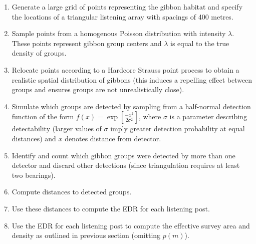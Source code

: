 \documentclass[10pt,a4paper,final]{article}
\begin{document}
\begin{tcolorbox}[breakable, colback=blue!5!white,colframe=blue!75!black]
\begin{enumerate}
\item Generate a large grid of points representing the gibbon habitat and specify the locations of a triangular listening array with spacings of 400 metres.

\item Sample points from a homogenous Poisson distribution with intensity $\lambda$. These points represent gibbon group centers and $\lambda$ is equal to the true density of groups.

\item Relocate points according to a Hardcore Strauss point process to obtain a realistic spatial distribution of gibbons (this induces a repelling effect between groups and ensures groups are not unrealistically close). 

\item Simulate which groups are detected by sampling from a half-normal detection function of the form
$f(x) = \exp \left[{\frac{-x^2}{2 \sigma^2}}\right]$, where $\sigma$ is a parameter describing detectability (larger values of $\sigma$ imply greater detection probability at equal distances) and $x$ denotes distance from detector.


\item Identify and count which gibbon groups were detected by more than one detector and discard other detections (since triangulation requires at least two bearings).

\item Compute distances to detected groups.

\item Use these distances to compute the EDR for each listening post.

\item Use the EDR for each listening post to compute the effective survey area and density as outlined in previous section (omitting $p(m)$).

\end{enumerate}
\end{tcolorbox}
\end{document}
